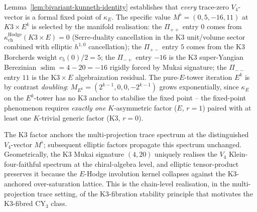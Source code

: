 \begin{remark}
\label{rem:fixed-point-selection}
Lemma~\ref{lem:bivariant-kunneth-identity} establishes that
\emph{every} trace-zero $V_4$-vector is a formal fixed point of
$\kappa_E$. The specific value $M^\flat = (0, 5, -16, 11)$ at
$K3 \times E^k$ is selected by the manifold realisation: the
$\Pi_{++}$ entry $0$ comes from $\kappa_{\mathrm{ch}}^{\mathrm{Hodge}}(K3 \times E)
= 0$ (Serre-duality cancellation in the K$3$ unit/volume sector
combined with elliptic $h^{1, 0}$ cancellation); the $\Pi_{+-}$
entry $5$ comes from the K$3$ Borcherds weight $c_5(0)/2 = 5$; the
$\Pi_{-+}$ entry $-16$ is the K$3$ super-Yangian Berezinian
$\operatorname{sdim} = 4 - 20 = -16$ rigidly forced by Mukai
signature; the $\Pi_{--}$ entry $11$ is the K$3 \times E$
algebraization residual. The pure-$E$-tower iteration $E^k$ is by
contrast \emph{doubling}: $M_{E^k} = (2^{k - 1}, 0, 0, -2^{k - 1})$
grows exponentially, since $\kappa_E$ on the $E^k$-tower has
no K$3$ anchor to stabilise the fixed point -- the fixed-point
phenomenon requires \emph{exactly one} $K$-asymmetric factor
\textup{(}$E$, $r = 1$\textup{)} paired with at least one $K$-trivial
generic factor \textup{(}K$3$, $r = 0$\textup{).}
\end{remark}

\begin{remark}
\label{rem:K3-anchor-E-propagator}
The K$3$ factor anchors the multi-projection trace spectrum at the
distinguished $V_4$-vector $M^\flat$; subsequent elliptic factors
propagate this spectrum unchanged. Geometrically, the K$3$ Mukai
signature $(4, 20)$ uniquely realises the $V_4$ Klein-four-faithful
spectrum at the chiral-algebra level, and elliptic tensor-product
preserves it because the $E$-Hodge involution kernel collapses against
the K$3$-anchored over-saturation lattice. This is the
chain-level realisation, in the multi-projection trace setting, of the
K$3$-fibration stability principle that motivates the
K$3$-fibred CY$_3$ class.
\end{remark}



